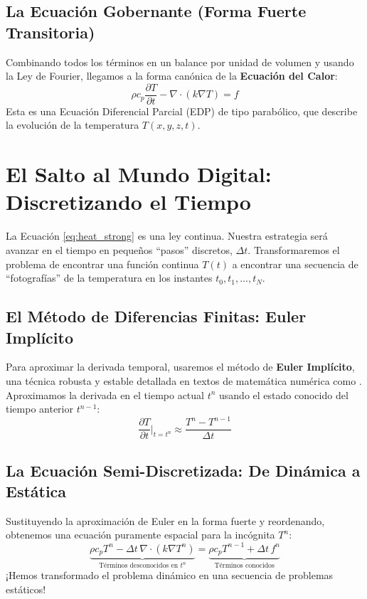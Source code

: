\subsection{La Ecuación Gobernante (Forma Fuerte Transitoria)}
Combinando todos los términos en un balance por unidad de volumen y usando la Ley de Fourier, llegamos a la forma canónica de la \textbf{Ecuación del Calor}:
\begin{equation}
    \rho c_p \frac{\partial T}{\partial t} - \nabla \cdot (k \nabla T) = f
    \label{eq:heat_strong}
\end{equation}
Esta es una Ecuación Diferencial Parcial (EDP) de tipo parabólico, que describe la evolución de la temperatura $T(x,y,z,t)$.

\section{El Salto al Mundo Digital: Discretizando el Tiempo}
La Ecuación \ref{eq:heat_strong} es una ley continua. Nuestra estrategia será avanzar en el tiempo en pequeños ``pasos'' discretos, $\Delta t$. Transformaremos el problema de encontrar una función continua $T(t)$ a encontrar una secuencia de ``fotografías'' de la temperatura en los instantes $t_0, t_1, \dots, t_N$.

\subsection{El Método de Diferencias Finitas: Euler Implícito}
Para aproximar la derivada temporal, usaremos el método de \textbf{Euler Implícito}, una técnica robusta y estable detallada en textos de matemática numérica como \cite{quarteroni2007}. Aproximamos la derivada en el tiempo actual $t^n$ usando el estado conocido del tiempo anterior $t^{n-1}$:
\begin{equation}
    \frac{\partial T}{\partial t} \bigg|_{t=t^n} \approx \frac{T^n - T^{n-1}}{\Delta t}
    \label{eq:euler}
\end{equation}

\subsection{La Ecuación Semi-Discretizada: De Dinámica a Estática}
Sustituyendo la aproximación de Euler en la forma fuerte y reordenando, obtenemos una ecuación puramente espacial para la incógnita $T^n$:
\begin{equation}
    \underbrace{\rho c_p T^n - \Delta t \, \nabla \cdot (k \nabla T^n)}_{\text{Términos desconocidos en } t^n} = \underbrace{\rho c_p T^{n-1} + \Delta t \, f^n}_{\text{Términos conocidos}}
    \label{eq:semidiscrete}
\end{equation}
¡Hemos transformado el problema dinámico en una secuencia de problemas estáticos!

